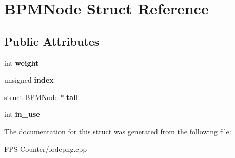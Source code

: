 \hypertarget{struct_b_p_m_node}{}\section{B\+P\+M\+Node Struct Reference}
\label{struct_b_p_m_node}
\subsection*{Public Attributes}
\begin{DoxyCompactItemize}
\item 
\mbox{\label{struct_b_p_m_node_a349ff0204b52858db88a47940509f14e}} 
int {\bfseries weight}
\item 
\mbox{\label{struct_b_p_m_node_a8a77213810f8e491f8d1f7d8793b641f}} 
unsigned {\bfseries index}
\item 
\mbox{\label{struct_b_p_m_node_a03f3ca43fe1eb8bee70592ebff763934}} 
struct \mbox{\hyperlink{struct_b_p_m_node}{B\+P\+M\+Node}} $\ast$ {\bfseries tail}
\item 
\mbox{\label{struct_b_p_m_node_ae0117b99903b29d19f41e0c242c25dca}} 
int {\bfseries in\+\_\+use}
\end{DoxyCompactItemize}


The documentation for this struct was generated from the following file\+:\begin{DoxyCompactItemize}
\item 
F\+P\+S Counter/lodepng.\+cpp\end{DoxyCompactItemize}

